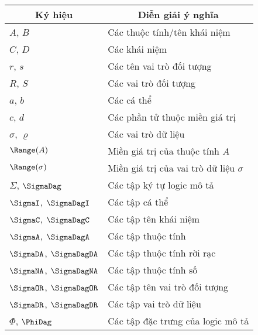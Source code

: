 \begin{tabular}{| p{2.5cm} | p{10.0cm} |}
	\hline
	\multicolumn{1}{|c|}{\bf Ký hiệu} & \multicolumn{1}{c|}{\bf Diễn giải ý nghĩa}\\
	\hline
	$A$, $B$ & Các thuộc tính/tên khái niệm \\
	$C$, $D$ & Các khái niệm \\
	$r$, $s$ & Các tên vai trò đối tượng \\
	$R$, $S$ & Các vai trò đối tượng \\
	$a$, $b$ & Các cá thể \\
	$c$, $d$ & Các phần tử thuộc miền giá trị \\
	$\sigma$, $\varrho$ & Các vai trò dữ liệu \\
	$\Range(A)$ & Miền giá trị của thuộc tính $A$ \\
	$\Range(\sigma)$ & Miền giá trị của vai trò dữ liệu $\sigma$ \\
	$\Sigma$, $\SigmaDag$ & Các tập ký tự logic mô tả \\
	$\SigmaI$, $\SigmaDagI$ & Các tập cá thể \\
	$\SigmaC$, $\SigmaDagC$ & Các tập tên khái niệm \\
	$\SigmaA$, $\SigmaDagA$ & Các tập thuộc tính \\	
	$\SigmaDA$, $\SigmaDagDA$ & Các tập thuộc tính rời rạc \\
	$\SigmaNA$, $\SigmaDagNA$ & Các tập thuộc tính số\\
	$\SigmaOR$, $\SigmaDagOR$ & Các tập tên vai trò đối tượng\\
	$\SigmaDR$, $\SigmaDagDR$ & Các tập vai trò dữ liệu\\
	$\Phi$, $\PhiDag$ & Các tập đặc trưng của logic mô tả\\

\end{tabular}
